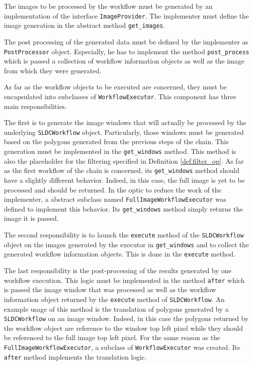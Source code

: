 The images to be processed by the workflow must be generated by an implementation of the interface \texttt{ImageProvider}. The implementer must define the image generation in the abstract method \texttt{get\_images}. 

The post processing of the generated data must be defined by the implementer as \texttt{PostProcessor} object. Especially, he has to implement the method \texttt{post\_process} which is passed a collection of workflow information objects as well as the image from which they were generated.

As far as the workflow objects to be executed are concerned, they must be encapsulated into subclasses of \texttt{WorkflowExecutor}. This component has three main responsibilities. 

The first is to generate the image windows that will actually be processed by the underlying \texttt{SLDCWorkflow} object. Particularly, those windows must be generated based on the polygons generated from the previous steps of the chain. This generation must be implemented in the \texttt{get\_windows} method. This method is also the placeholder for the filtering specified in Definition \ref{def:filter_op}. As far as the first workflow of the chain is concerned, its \texttt{get\_windows} method should have a slightly different behavior. Indeed, in this case, the full image is yet to be processed and should be returned. In the optic to reduce the work of the implementer, a abstract subclass named \texttt{FullImageWorkflowExecutor} was defined to implement this behavior. Its \texttt{get\_windows} method simply returns the image it is passed. 

The second responsibility is to launch the \texttt{execute} method of the \texttt{SLDCWorkflow} object on the images generated by the executor in \texttt{get\_windows} and to collect the generated workflow information objects. This is done in the \texttt{execute} method. 

The last responsibility is the post-processing of the results generated by one workflow execution. This logic must be implemented in the method \texttt{after} which is passed the image window that was processed as well as the workflow information object returned by the \texttt{execute} method of \texttt{SLDCWorkflow}. An example usage of this method is the translation of polygons generated by a \texttt{SLDCWorkflow} on an image window. Indeed, in this case the polygons returned by the workflow object are reference to the window top left pixel while they should be referenced to the full image top left pixel. For the same reason as the \texttt{FullImageWorkflowExecutor}, a subclass of \texttt{WorkflowExecutor} was created. Its \texttt{after} method implements the translation logic.

